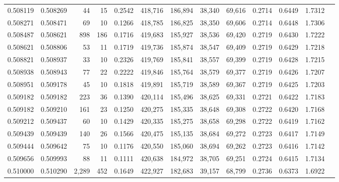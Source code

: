 \begin{tabular}{rrrrrrrrrrrrr}
0.508119 & 0.508269 &    44 &  15 &                                     0.2542 & 418,716 & 186,894 &  38,340 &  69,616 & 0.2714 & 0.6449 & 1.7312 \\
0.508271 & 0.508471 &    69 &  10 &                                     0.1266 & 418,785 & 186,825 &  38,350 &  69,606 & 0.2714 & 0.6448 & 1.7306 \\
0.508487 & 0.508621 &   898 & 186 &                                     0.1716 & 419,683 & 185,927 &  38,536 &  69,420 & 0.2719 & 0.6430 & 1.7222 \\
0.508621 & 0.508806 &    53 &  11 &                                     0.1719 & 419,736 & 185,874 &  38,547 &  69,409 & 0.2719 & 0.6429 & 1.7218 \\
0.508821 & 0.508937 &    33 &  10 &                                     0.2326 & 419,769 & 185,841 &  38,557 &  69,399 & 0.2719 & 0.6428 & 1.7215 \\
0.508938 & 0.508943 &    77 &  22 &                                     0.2222 & 419,846 & 185,764 &  38,579 &  69,377 & 0.2719 & 0.6426 & 1.7207 \\
0.508951 & 0.509178 &    45 &  10 &                                     0.1818 & 419,891 & 185,719 &  38,589 &  69,367 & 0.2719 & 0.6425 & 1.7203 \\
0.509182 & 0.509182 &   223 &  36 &                                     0.1390 & 420,114 & 185,496 &  38,625 &  69,331 & 0.2721 & 0.6422 & 1.7183 \\
0.509182 & 0.509210 &   161 &  23 &                                     0.1250 & 420,275 & 185,335 &  38,648 &  69,308 & 0.2722 & 0.6420 & 1.7168 \\
0.509212 & 0.509437 &    60 &  10 &                                     0.1429 & 420,335 & 185,275 &  38,658 &  69,298 & 0.2722 & 0.6419 & 1.7162 \\
0.509439 & 0.509439 &   140 &  26 &                                     0.1566 & 420,475 & 185,135 &  38,684 &  69,272 & 0.2723 & 0.6417 & 1.7149 \\
0.509444 & 0.509642 &    75 &  10 &                                     0.1176 & 420,550 & 185,060 &  38,694 &  69,262 & 0.2723 & 0.6416 & 1.7142 \\
0.509656 & 0.509993 &    88 &  11 &                                     0.1111 & 420,638 & 184,972 &  38,705 &  69,251 & 0.2724 & 0.6415 & 1.7134 \\
0.510000 & 0.510290 & 2,289 & 452 &                                     0.1649 & 422,927 & 182,683 &  39,157 &  68,799 & 0.2736 & 0.6373 & 1.6922 \\

\end{tabular}
